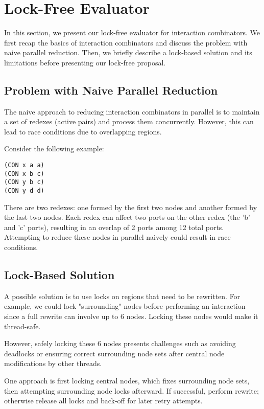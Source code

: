 \documentclass{article}
\begin{document}
\section{Lock-Free Evaluator}\label{s:lockfree}

In this section, we present our lock-free evaluator for interaction combinators. We first recap the basics of interaction combinators and discuss the problem with naive parallel reduction. Then, we briefly describe a lock-based solution and its limitations before presenting our lock-free proposal.

\subsection{Problem with Naive Parallel Reduction}\label{ss:problem}

The naive approach to reducing interaction combinators in parallel is to maintain a set of redexes (active pairs) and process them concurrently. However, this can lead to race conditions due to overlapping regions.

Consider the following example:

\begin{verbatim}
(CON x a a)
(CON x b c)
(CON y b c)
(CON y d d)
\end{verbatim}

There are two redexes: one formed by the first two nodes and another formed by the last two nodes. Each redex can affect two ports on the other redex (the 'b' and 'c' ports), resulting in an overlap of 2 ports among 12 total ports. Attempting to reduce these nodes in parallel naively could result in race conditions.

\subsection{Lock-Based Solution}\label{ss:lockbased}

A possible solution is to use locks on regions that need to be rewritten. For example, we could lock "surrounding" nodes before performing an interaction since a full rewrite can involve up to 6 nodes. Locking these nodes would make it thread-safe.

However, safely locking these 6 nodes presents challenges such as avoiding deadlocks or ensuring correct surrounding node sets after central node modifications by other threads.

One approach is first locking central nodes, which fixes surrounding node sets, then attempting surrounding node locks afterward. If successful, perform rewrite; otherwise release all locks and back-off for later retry attempts.
\end{document}
